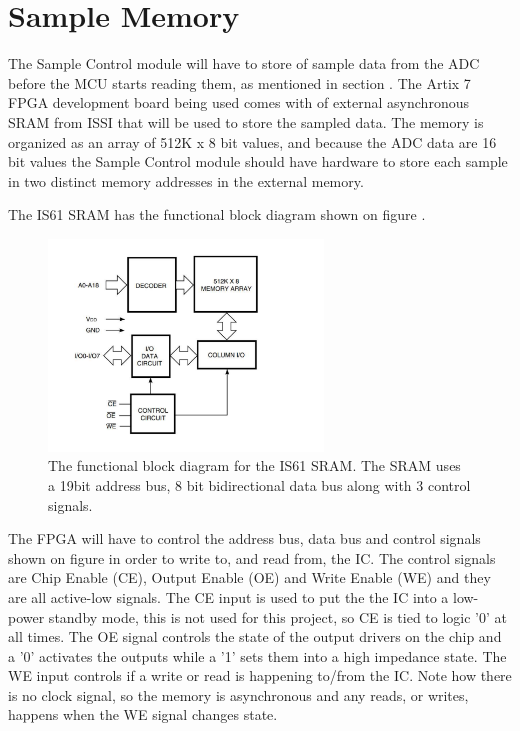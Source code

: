 \section{Sample Memory} \label{subsec:Sample_Memory} 
The Sample Control module will have to store  of sample data from the ADC before the MCU starts reading them, as mentioned in section . The Artix 7 FPGA development\cite{CMOD_A7_AT35T} board being used comes with  of external asynchronous SRAM from ISSI\cite{ISSISRAM} that will be used to store the sampled data. The memory is organized as an array of 512K x 8 bit values, and because the ADC data are 16 bit values the Sample Control module should have hardware to store each sample in two distinct memory addresses in the external memory.

The IS61 SRAM has the functional block diagram shown on figure .

\begin{figure}[H]
    \centering
    \includegraphics[clip, trim=0 0 0 0, width=0.65\textwidth]{Sections/7_SystemDesign/Figures/7_2_5_IS61_BLOCK_DIAGRAM.pdf}
    \caption{The functional block diagram for the IS61 SRAM\cite{ISSISRAM}. The SRAM uses a 19bit address bus, 8 bit bidirectional data bus along with 3 control signals.}
    \label{fig:7_2_5_IS61Block}
\end{figure}

The FPGA will have to control the address bus, data bus and control signals shown on figure  in order to write to, and read from, the IC. The control signals are Chip Enable (CE), Output Enable (OE) and Write Enable (WE) and they are all active-low signals. The CE input is used to put the the IC into a low-power standby mode, this is not used for this project, so CE is tied to logic '0' at all times. The OE signal controls the state of the output drivers on the chip and a '0' activates the outputs while a '1' sets them into a high impedance state. The WE input controls if a write or read is happening to/from the IC. Note how there is no clock signal, so the memory is asynchronous and any reads, or writes, happens when the WE signal changes state.


